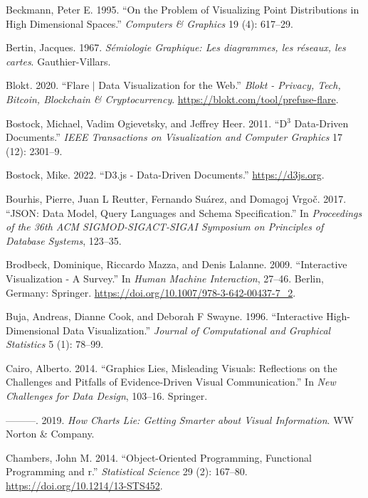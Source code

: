 \documentclass[
]{book}
\newlength{\cslhangindent}
\newenvironment{CSLReferences}[2] %
 {\begin{list}{}{%
  \setlength{\itemindent}{0pt}
  \setlength{\leftmargin}{0pt}
  \setlength{\parsep}{0pt}
  \ifodd #1
   \setlength{\leftmargin}{\cslhangindent}
   \setlength{\itemindent}{-1\cslhangindent}
  \fi
  \setlength{\itemsep}{#2\baselineskip}}}
 {\end{list}}
\theoremstyle{definition}
\theoremstyle{definition}
\theoremstyle{definition}
\theoremstyle{definition}
\theoremstyle{remark}
\begin{document}
\begin{CSLReferences}{1}{0}
Beckmann, Peter E. 1995. {``On the Problem of Visualizing Point Distributions in High Dimensional Spaces.''} \emph{Computers \& Graphics} 19 (4): 617--29.

Bertin, Jacques. 1967. \emph{{Sémiologie Graphique: Les diagrammes, les réseaux, les cartes}}. Gauthier-Villars.

Blokt. 2020. {``Flare {\(\vert\)} Data Visualization for the Web.''} \emph{Blokt - Privacy, Tech, Bitcoin, Blockchain {\&} Cryptocurrency}. \url{https://blokt.com/tool/prefuse-flare}.

Bostock, Michael, Vadim Ogievetsky, and Jeffrey Heer. 2011. {``D\(^3\) Data-Driven Documents.''} \emph{IEEE Transactions on Visualization and Computer Graphics} 17 (12): 2301--9.

Bostock, Mike. 2022. {``{D3.js - Data-Driven Documents}.''} \url{https://d3js.org}.

Bourhis, Pierre, Juan L Reutter, Fernando Suárez, and Domagoj Vrgoč. 2017. {``JSON: Data Model, Query Languages and Schema Specification.''} In \emph{Proceedings of the 36th ACM SIGMOD-SIGACT-SIGAI Symposium on Principles of Database Systems}, 123--35.

Brodbeck, Dominique, Riccardo Mazza, and Denis Lalanne. 2009. {``{Interactive Visualization - A Survey}.''} In \emph{{Human Machine Interaction}}, 27--46. Berlin, Germany: Springer. \url{https://doi.org/10.1007/978-3-642-00437-7_2}.

Buja, Andreas, Dianne Cook, and Deborah F Swayne. 1996. {``Interactive High-Dimensional Data Visualization.''} \emph{Journal of Computational and Graphical Statistics} 5 (1): 78--99.

Cairo, Alberto. 2014. {``Graphics Lies, Misleading Visuals: Reflections on the Challenges and Pitfalls of Evidence-Driven Visual Communication.''} In \emph{New Challenges for Data Design}, 103--16. Springer.

---------. 2019. \emph{How Charts Lie: Getting Smarter about Visual Information}. WW Norton \& Company.

Chambers, John M. 2014. {``Object-Oriented Programming, Functional Programming and r.''} \emph{Statistical Science} 29 (2): 167--80. \url{https://doi.org/10.1214/13-STS452}.


\end{CSLReferences}
\end{document}
